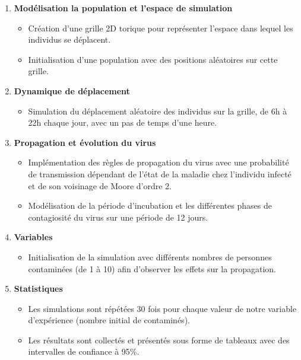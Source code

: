 \documentclass[12pt,french,titlepage]{article}
\begin{document}
\begin{enumerate}

\item \textbf{Modélisation la population et l'espace de simulation}
\begin{itemize}
\item Création d'une grille 2D torique pour représenter l'espace dans lequel les individus se déplacent.
\item Initialisation d'une population avec des positions aléatoires sur cette grille.
\end{itemize}

\item \textbf{Dynamique de déplacement}
\begin{itemize}
\item Simulation du déplacement aléatoire des individus sur la grille, de 6h à 22h chaque jour, avec un pas de temps d'une heure.
\end{itemize}

\item \textbf{Propagation et évolution du virus}
\begin{itemize}
\item Implémentation des règles de propagation du virus avec une probabilité de transmission dépendant de l'état de la maladie chez l'individu infecté et de son voisinage de Moore d'ordre 2.
\item Modélisation de la période d'incubation et les différentes phases de contagiosité du virus sur une période de 12 jours.
\end{itemize}

\item \textbf{Variables}
\begin{itemize}
\item Initialisation de la simulation avec différents nombres de personnes contaminées (de 1 à 10) afin d'observer les effets sur la propagation.
\end{itemize}

\item \textbf{Statistiques}
\begin{itemize}
\item Les simulations sont répétées 30 fois pour chaque valeur de notre variable d'expérience (nombre initial de contaminés).
\item Les résultats sont collectés et présentés sous forme de tableaux avec des intervalles de confiance à 95\%.
\end{itemize}

\end{enumerate}
 
\end{document}
